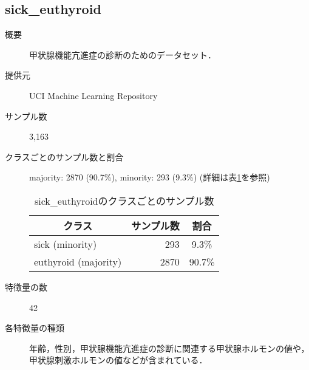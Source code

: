 \subsection{sick\_euthyroid}
\begin{description}
    \item[概要] 甲状腺機能亢進症の診断のためのデータセット．\cite{thyroid}
    \item[提供元] UCI Machine Learning Repository
    \item[サンプル数] 3,163
    \item[クラスごとのサンプル数と割合] majority: 2870 (90.7\%), minority: 293 (9.3\%) (詳細は表\ref{tab:sick_euthyroid}を参照)
        \begin{table}[htbp]
            \centering
            \caption{sick\_euthyroidのクラスごとのサンプル数}
            \label{tab:sick_euthyroid}
            \begin{tabular}{lrc} \hline
                \multicolumn{1}{c}{クラス}&
                \multicolumn{1}{c}{サンプル数}&
                \multicolumn{1}{c}{割合}\\
                \hline
                \hline
                sick (minority)& 293 & 9.3\% \\
                euthyroid (majority)& 2870 & 90.7\% \\
                \hline
            \end{tabular}
        \end{table}

    \item[特徴量の数] 42
    \item[各特徴量の種類] \mbox{}
        年齢，性別，甲状腺機能亢進症の診断に関連する甲状腺ホルモンの値や，甲状腺刺激ホルモンの値などが含まれている．
\end{description}


